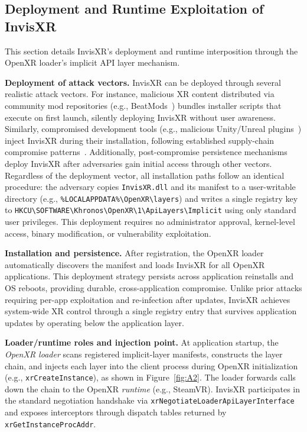 \documentclass[letterpaper,twocolumn,10pt]{article}
\begin{document}
\subsection{Deployment and Runtime Exploitation of InvisXR} 
\label{sec:Deployment}
This section details InvisXR's deployment and runtime interposition through the OpenXR loader's implicit API layer mechanism. 

\noindent\textbf{Deployment of attack vectors.} InvisXR can be deployed through several realistic attack vectors. For instance, malicious XR content distributed via community mod repositories (e.g., BeatMods~\cite{BeatMods}) bundles installer scripts that execute on first launch, silently deploying InvisXR without user awareness. Similarly, compromised development tools (e.g., malicious Unity/Unreal plugins~\cite{Modassistant}) inject InvisXR during their installation, following established supply-chain compromise patterns~\cite{Netlas_2025_supply_chain}. Additionally, post-compromise persistence mechanisms deploy InvisXR after adversaries gain initial access through other vectors. Regardless of the deployment vector, all installation paths follow an identical procedure: the adversary copies \texttt{InvisXR.dll} and its manifest to a user-writable directory (e.g., \texttt{\%LOCALAPPDATA\%\textbackslash OpenXR\textbackslash layers}) and writes a single registry key to \texttt{HKCU\allowbreak\textbackslash SOFTWARE\allowbreak\textbackslash Khronos\allowbreak\textbackslash OpenXR\allowbreak\textbackslash 1\allowbreak\textbackslash ApiLayers\allowbreak\textbackslash Implicit} using only standard user privileges. This deployment requires no administrator approval, kernel-level access, binary modification, or vulnerability exploitation.

\noindent\textbf{Installation and persistence.} After registration, the OpenXR loader automatically discovers the manifest and loads InvisXR for all OpenXR applications. This deployment strategy persists across application reinstalls and OS reboots, providing durable, cross-application compromise. Unlike prior attacks requiring per-app exploitation and re-infection after updates, InvisXR achieves system-wide XR control through a single registry entry that survives application updates by operating below the application layer.

\noindent\textbf{Loader/runtime roles and injection point.} At application startup, the \emph{OpenXR loader} scans registered implicit-layer manifests, constructs the layer chain, and injects each layer into the client process during OpenXR initialization (e.g., \texttt{xrCreateInstance}), as shown in Figure~\ref{fig:A2}. The loader forwards calls down the chain to the OpenXR \emph{runtime} (e.g., SteamVR). InvisXR participates in the standard negotiation handshake via \texttt{xrNegotiateLoaderApiLayerInterface} and exposes interceptors through dispatch tables returned by \texttt{xrGetInstanceProcAddr}.
\end{document}
